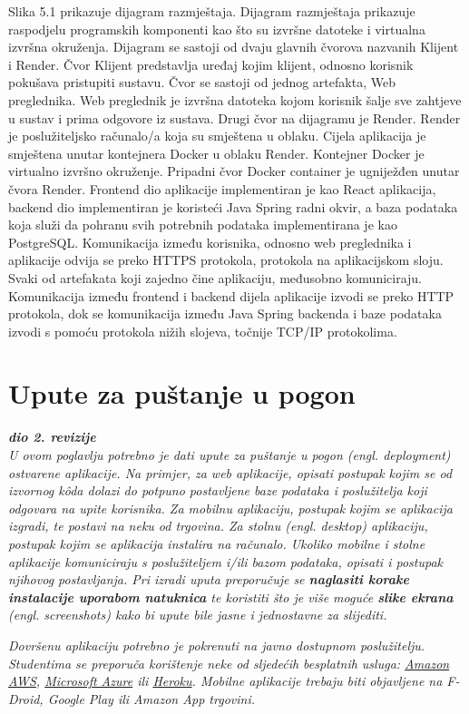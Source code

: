 			 \newpage
			 
			 Slika 5.1 prikazuje dijagram razmještaja. Dijagram razmještaja prikazuje raspodjelu programskih komponenti kao što su izvršne datoteke i virtualna izvršna okruženja. Dijagram se sastoji od dvaju glavnih čvorova nazvanih Klijent i Render. Čvor Klijent predstavlja uređaj kojim klijent, odnosno korisnik pokušava pristupiti sustavu. Čvor se sastoji od jednog artefakta, Web preglednika. Web preglednik je izvršna datoteka kojom korisnik šalje sve zahtjeve u sustav i prima odgovore iz sustava. Drugi čvor na dijagramu je Render. Render je poslužiteljsko računalo/a koja su smještena u oblaku. Cijela aplikacija je smještena unutar kontejnera Docker u oblaku Render. Kontejner Docker je virtualno izvršno okruženje. Pripadni čvor Docker container je ugniježđen unutar čvora Render. Frontend dio aplikacije implementiran je kao React aplikacija, backend dio implementiran je koristeći Java Spring radni okvir, a baza podataka koja služi da pohranu svih potrebnih podataka implementirana je kao PostgreSQL. Komunikacija između korisnika, odnosno web preglednika i aplikacije odvija se preko HTTPS protokola, protokola na aplikacijskom sloju. Svaki od artefakata koji zajedno čine aplikaciju, međusobno komuniciraju. Komunikacija između frontend i backend dijela aplikacije izvodi se preko HTTP protokola, dok se komunikacija između Java Spring backenda i baze podataka izvodi s pomoću protokola nižih slojeva, točnije TCP/IP protokolima.
			
			\eject 
		
		\section{Upute za puštanje u pogon}
		
			\textbf{\textit{dio 2. revizije}}\\
		
			 \textit{U ovom poglavlju potrebno je dati upute za puštanje u pogon (engl. deployment) ostvarene aplikacije. Na primjer, za web aplikacije, opisati postupak kojim se od izvornog kôda dolazi do potpuno postavljene baze podataka i poslužitelja koji odgovara na upite korisnika. Za mobilnu aplikaciju, postupak kojim se aplikacija izgradi, te postavi na neku od trgovina. Za stolnu (engl. desktop) aplikaciju, postupak kojim se aplikacija instalira na računalo. Ukoliko mobilne i stolne aplikacije komuniciraju s poslužiteljem i/ili bazom podataka, opisati i postupak njihovog postavljanja. Pri izradi uputa preporučuje se \textbf{naglasiti korake instalacije uporabom natuknica} te koristiti što je više moguće \textbf{slike ekrana} (engl. screenshots) kako bi upute bile jasne i jednostavne za slijediti.}
			
			
			 \textit{Dovršenu aplikaciju potrebno je pokrenuti na javno dostupnom poslužitelju. Studentima se preporuča korištenje neke od sljedećih besplatnih usluga: \href{https://aws.amazon.com/}{Amazon AWS}, \href{https://azure.microsoft.com/en-us/}{Microsoft Azure} ili \href{https://www.heroku.com/}{Heroku}. Mobilne aplikacije trebaju biti objavljene na F-Droid, Google Play ili Amazon App trgovini.}
			
			
			\eject 